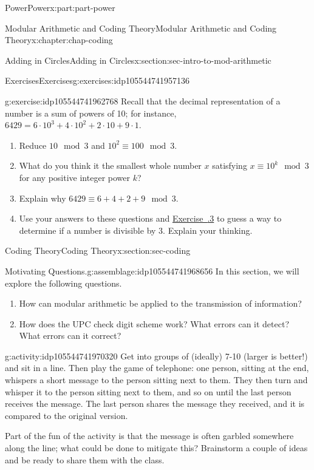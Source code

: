 \documentclass[oneside,10pt,]{book}
\newcommand{\xreffont}{\relax}
\numberwithin{equation}{section}
\begin{document}
\begin{partptx}{Power}{}{Power}{}{}{x:part:part-power}
\begin{chapterptx}{Modular Arithmetic and Coding Theory}{}{Modular Arithmetic and Coding Theory}{}{}{x:chapter:chap-coding}
\begin{sectionptx}{Adding in Circles}{}{Adding in Circles}{}{}{x:section:sec-intro-to-mod-arithmetic}
\begin{exercises-subsection-numberless}{Exercises}{}{Exercises}{}{}{g:exercises:idp105544741957136}
\begin{divisionexercise}{4}{}{}{g:exercise:idp105544741962768}
Recall that the decimal representation of a number is a sum of powers of 10; for instance, \(6429 = 6\cdot 10^3 + 4\cdot 10^2 + 2\cdot 10 + 9\cdot 1\).%
%
\begin{enumerate}[label=(\alph*)]
\item{}Reduce \(10\mod 3\) and \(10^2 \equiv 100\mod 3\).%
\item{}What do you think it the smallest whole number \(x\) satisfying \(x\equiv 10^k\mod 3\) for any positive integer power \(k\)?%
\item{}Explain why \(6429 \equiv 6 + 4 + 2 + 9 \mod 3\).%
\item{}Use your answers to these questions and \hyperlink{x:exercise:exer-divisibility-mod-m}{Exercise~{\xreffont 6.1.3}} to guess a way to determine if a number is divisible by 3. Explain your thinking.%
\end{enumerate}
\end{divisionexercise}%
\end{exercises-subsection-numberless}
\end{sectionptx}
%
%
\typeout{************************************************}
\typeout{************************************************}
%
\begin{sectionptx}{Coding Theory}{}{Coding Theory}{}{}{x:section:sec-coding}
\begin{assemblage}{Motivating Questions.}{g:assemblage:idp105544741968656}%
In this section, we will explore the following questions. %
\begin{enumerate}
\item{}How can modular arithmetic be applied to the transmission of information?%
\item{}How does the UPC check digit scheme work? What errors can it detect? What errors can it correct?%
\end{enumerate}
%
\end{assemblage}
\begin{activity}{}{g:activity:idp105544741970320}%
Get into groups of (ideally) 7-10 (larger is better!) and sit in a line. Then play the game of telephone: one person, sitting at the end, whispers a short message to the person sitting next to them. They then turn and whisper it to the person sitting next to them, and so on until the last person receives the message. The last person shares the message they received, and it is compared to the original version.%
\par
Part of the fun of the activity is that the message is often garbled somewhere along the line; what could be done to mitigate this? Brainstorm a couple of ideas and be ready to share them with the class.%

\end{activity}
\end{sectionptx}
\end{chapterptx}
\end{partptx}
\end{document}
